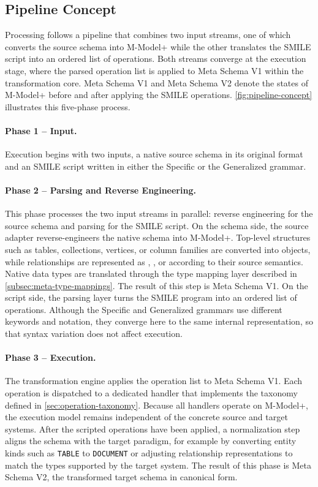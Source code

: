   \subsection{Pipeline Concept}

  Processing follows a pipeline that combines two input streams, one of which converts the source schema into M-Model+ while the
  other translates the SMILE  script into an ordered list of operations. Both streams converge at the execution stage, where the parsed operation list is applied to Meta Schema V1 within the transformation core. Meta Schema V1 and Meta Schema V2 denote the states of M-Model+ before and after applying the SMILE  operations. \autoref{fig:pipeline-concept} illustrates this five-phase process.

  \paragraph{Phase 1 -- Input.}

Execution begins with two inputs, a native source schema in its original format and an SMILE  script written in either the Specific or the
Generalized grammar.

  \paragraph{Phase 2 -- Parsing and Reverse Engineering.}
  This phase processes the two input streams in parallel: reverse engineering for the source schema and parsing for the SMILE script. On the schema
  side, the source adapter reverse-engineers the native schema into M-Model+. Top-level structures such as tables, collections, vertices, or column
  families are converted into  objects, while relationships are represented as , , or  according
  to their source semantics. Native data types are translated through the type mapping layer described in \autoref{subsec:meta-type-mappings}. The
  result of this step is Meta Schema V1. On the script side, the parsing layer turns the SMILE  program into an ordered list of operations. Although
  the Specific and Generalized grammars use different keywords and notation, they converge here to the same internal representation, so that syntax
  variation does not affect execution.


  \paragraph{Phase 3 -- Execution.}
  The transformation engine applies the operation list to Meta Schema V1. Each operation is dispatched to a dedicated handler that implements the
  taxonomy defined in \autoref{sec:operation-taxonomy}. Because all handlers operate on M-Model+, the execution model remains independent of the
  concrete source and target systems. After the scripted operations have been applied, a normalization step aligns the schema with the target paradigm, for example by converting entity kinds such as \texttt{TABLE} to \texttt{DOCUMENT} or adjusting relationship representations to match the types supported by the target system. The result of this phase is Meta Schema V2, the transformed target schema in canonical form.

